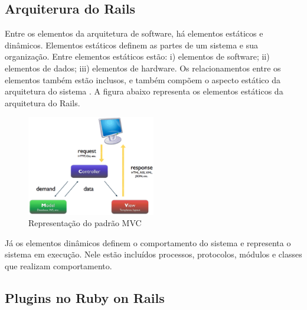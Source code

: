 
\subsection{Arquiterura do Rails}

Entre os elementos da arquitetura de software, há elementos estáticos e dinâmicos. Elementos estáticos definem as partes de um sistema e sua organização. Entre elementos estáticos estão: i) elementos de software; ii) elementos de dados; iii) elementos de hardware. Os relacionamentos entre os elementos também estão inclusos, e também compõem o aspecto estático da arquitetura do sistema \cite{germoglio2010fundamentos}. A figura abaixo representa os elementos estáticos da arquitetura do Rails.

\graphicspath{{figuras/}}
\begin{figure}[H]
\centering
\includegraphics[width=0.5\textwidth]{mvc}
\caption{Representação do padrão MVC}
\label{mvc}
\end{figure}

Já os elementos dinâmicos definem o comportamento do sistema e representa o sistema em execução. Nele estão incluídos processos, protocolos, módulos e classes que realizam comportamento.

\subsection{Plugins no Ruby on Rails}